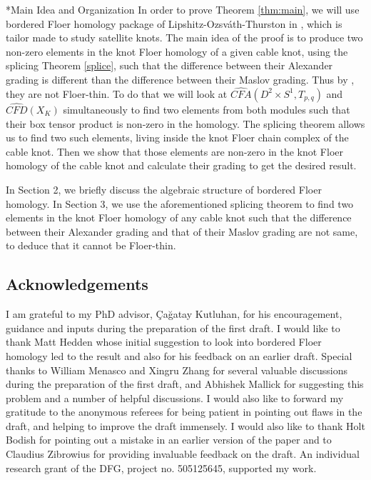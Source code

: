 \documentclass[11pt,reqno]{amsart}
\theoremstyle{definition}
\newtheorem *{remark}{Remark}
\newcommand{\cfahat}{\widehat{\mathit{CFA}}}
\newcommand{\cfdhat}{\widehat{\mathit{CFD}}}
\begin{document}
\begin{subsection}*{Main Idea and Organization}
In order to prove Theorem \ref{thm:main}, we will use bordered Floer homology package of Lipshitz-Ozsv\'ath-Thurston in \cite{lot08}, which is tailor made to study satellite knots. The main idea of the proof is to produce two non-zero elements in the knot Floer homology of a given cable knot, using the splicing Theorem \ref{splice}, such that the difference between their Alexander grading is different than the difference between their Maslov grading. Thus by \cite[Theorem 1.2]{mo07}, they are not Floer-thin. To do that we will look at $\cfahat(D^2 \times S^1, T_{p,q})$ and $\cfdhat(X_K)$ simultaneously to find two elements from both modules such that their box tensor product is non-zero in the homology. The splicing theorem allows us to find two such elements, living inside the knot Floer chain complex of the cable knot. Then we show that those elements are non-zero in the knot Floer homology of the cable knot and calculate their grading to get the desired result. 

In  Section 2, we briefly discuss the algebraic structure of bordered Floer homology. In Section 3, we use the aforementioned splicing theorem to find two elements in the knot Floer homology of any cable knot such that the difference between their Alexander grading and that of their Maslov grading are not same, to deduce that it cannot be Floer-thin. 
    
    \end{subsection}


\subsection*{Acknowledgements}
I am grateful to my PhD advisor, \c{C}a\u{g}atay Kutluhan, for his encouragement, guidance and inputs during the preparation of the first draft. I would like to thank Matt Hedden whose initial suggestion to look into bordered Floer homology led to the result and also for his feedback on an earlier draft. Special thanks to William Menasco and Xingru Zhang for several valuable discussions during the preparation of the first draft, and Abhishek Mallick for suggesting this problem and a number of helpful discussions. I would also like to forward my gratitude to the anonymous referees for being patient in pointing out flaws in the draft, and helping to improve the draft immensely. I would also like to thank Holt Bodish for pointing out a mistake in an earlier version of the paper and to Claudius Zibrowius for providing invaluable feedback on the draft. An individual research grant of the DFG, project no. 505125645, supported my work.
\end{document}
